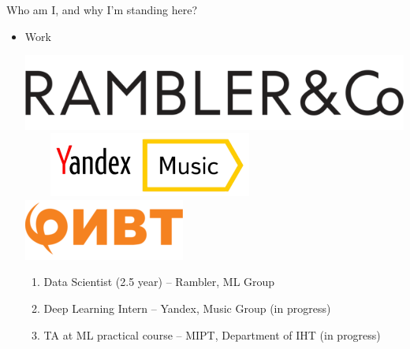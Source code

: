 \documentclass{beamer}
\begin{document}
\begin{frame}{Who am I, and why I'm standing here?}
\begin{itemize}
		\vspace{0.5cm}
			
		\item Work 
		\begin{center}
			\includegraphics[scale=0.1]{img/ramblerco} ~~~~ \includegraphics[scale=0.2]{img/yandex_music} ~~~~ \includegraphics[scale=0.2]{img/fivt} 	
			\begin{enumerate}
				\item Data Scientist (2.5 year)  -- Rambler, ML Group
				\item Deep Learning Intern -- Yandex, Music Group  (in progress)
				\item TA at ML practical course -- MIPT, Department of IHT  (in progress)
			\end{enumerate}	 		
		\end{center}
		
		
	\end{itemize}
\end{frame}
\end{document}
